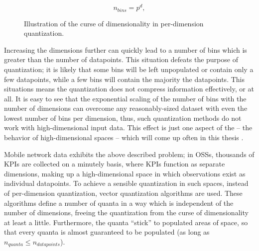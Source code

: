 			\begin{figure}[ht]
				\centering
				\begin{minipage}[t]{0.2\linewidth}
					\begin{equation}
						\label{eq:bin_curse_of_dim}
						n_{bins} = p^d,
					\end{equation}
				\end{minipage}
				\begin{minipage}[t]{0.6\linewidth}
				\end{minipage}
				\caption[Illustration of the curse of dimensionality in per-dimension quantization]{Illustration of the curse of dimensionality in per-dimension quantization.}
				\label{fig:perdim_curse}
			\end{figure}
			
			Increasing the dimensions further can quickly lead to a number of bins which is greater than the number of datapoints.
			This situation defeats the purpose of quantization; it is likely that some bins will be left unpopulated or contain only a few datapoints, while a few bins will contain the majority the datapoints.
			This situations means the quantization does not compress information effectively, or at all.
			It is easy to see that the exponential scaling of the number of bins with the number of dimensions can overcome any reasonably-sized dataset with even the lowest number of bins per dimension, thus, such quantization methods do not work with high-dimensional input data.
			This effect is just one aspect of the  -- the behavior of high-dimensional spaces -- which will come up often in this thesis \cite{curse_of_dim}.
			
			Mobile network data exhibits the above described problem; in \acp{OSS}, thousands of \acp{KPI} are collected on a minutely basis, where \acp{KPI} function as separate dimensions, making up a high-dimensional space in which observations exist as individual datapoints.
			To achieve a sensible quantization in such spaces, instead of per-dimension quantization, vector quantization algorithms are used.
			These algorithms define a number of quanta in a way which is independent of the number of dimensions, freeing the quantization from the curse of dimensionality at least a little.
			Furthermore, the quanta ``stick'' to populated areas of space, so that every quanta is almost guaranteed to be populated (as long as $n_{quanta} \leq n_{datapoints}$).		
			
